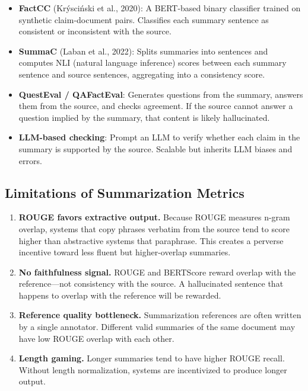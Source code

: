 \begin{itemize}
    \item \textbf{FactCC} (Kr\'{y}sci\'{n}ski et al., 2020): A BERT-based binary
          classifier trained on synthetic claim-document pairs.  Classifies
          each summary sentence as consistent or inconsistent with the source.

    \item \textbf{SummaC} (Laban et al., 2022): Splits summaries into sentences
          and computes NLI (natural language inference) scores between each
          summary sentence and source sentences, aggregating into a consistency
          score.

    \item \textbf{QuestEval / QAFactEval}: Generates questions from the summary,
          answers them from the source, and checks agreement.  If the source
          cannot answer a question implied by the summary, that content is
          likely hallucinated.

    \item \textbf{LLM-based checking}: Prompt an LLM to verify whether each
          claim in the summary is supported by the source.  Scalable but
          inherits LLM biases and errors.
\end{itemize}

\subsection{Limitations of Summarization Metrics}

\begin{enumerate}[label=\textbf{\arabic*.}]
    \item \textbf{ROUGE favors extractive output.}  Because ROUGE measures
          n-gram overlap, systems that copy phrases verbatim from the source
          tend to score higher than abstractive systems that paraphrase.  This
          creates a perverse incentive toward less fluent but higher-overlap
          summaries.

    \item \textbf{No faithfulness signal.}  ROUGE and BERTScore reward overlap
          with the reference---not consistency with the source.  A hallucinated
          sentence that happens to overlap with the reference will be rewarded.

    \item \textbf{Reference quality bottleneck.}  Summarization references are
          often written by a single annotator.  Different valid summaries of the
          same document may have low ROUGE overlap with each other.

    \item \textbf{Length gaming.}  Longer summaries tend to have higher ROUGE
          recall.  Without length normalization, systems are incentivized to
          produce longer output.
\end{enumerate}

